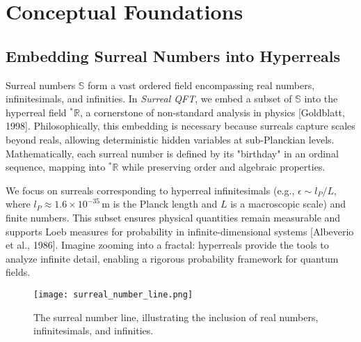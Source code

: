 \documentclass{article}
\begin{document}
\section{Conceptual Foundations}
\subsection{Embedding Surreal Numbers into Hyperreals}
Surreal numbers \(\mathbb{S}\) form a vast ordered field encompassing real numbers, infinitesimals, and infinities. In \textit{Surreal QFT}, we embed a subset of \(\mathbb{S}\) into the hyperreal field \({}^*\mathbb{R}\), a cornerstone of non-standard analysis in physics [Goldblatt, 1998]. Philosophically, this embedding is necessary because surreals capture scales beyond reals, allowing deterministic hidden variables at sub-Planckian levels. Mathematically, each surreal number is defined by its "birthday" in an ordinal sequence, mapping into \({}^*\mathbb{R}\) while preserving order and algebraic properties.

We focus on surreals corresponding to hyperreal infinitesimals (e.g., \(\epsilon \sim l_P / L\), where \(l_P \approx 1.6 \times 10^{-35} \, \text{m}\) is the Planck length and \(L\) is a macroscopic scale) and finite numbers. This subset ensures physical quantities remain measurable and supports Loeb measures for probability in infinite-dimensional systems [Albeverio et al., 1986]. Imagine zooming into a fractal: hyperreals provide the tools to analyze infinite detail, enabling a rigorous probability framework for quantum fields.

\begin{figure}[h]
    \centering
    \texttt{[image: surreal\_number\_line.png]}
    \caption{The surreal number line, illustrating the inclusion of real numbers, infinitesimals, and infinities.}
    \label{fig:surreal_line}
\end{figure}
\end{document}
